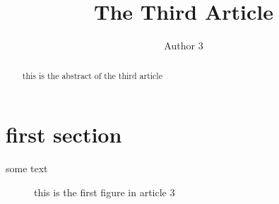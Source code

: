 \documentclass[a4paper]{article}
\title{The Third Article}
\author{Author 3}
\date{}
\begin{document}
	
	\maketitle
	
	\begin{abstract}
		this is the abstract of the third article
	\end{abstract}
	
	\section{first section}
	some text
	
	\begin{figure}
		\caption{this is the first figure in article 3}
	\end{figure}
	
\end{document}

